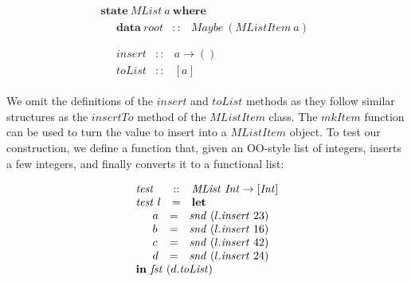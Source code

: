\documentclass[runningheads,a4paper]{llncs}
\begin{document}
\begin{displaymath}
\begin{array}{l}
\mathbf{state}~\mathit{MList}~a~\mathbf{where} \\
\quad \begin{array}{lcl}
\mathbf{data}~\mathit{root}  & :: & \mathit{Maybe}~(\mathit{MListItem}~a)
\end{array}\\\\
\quad \begin{array}{lcl}
\mathit{insert} & :: & a \to () \\
\mathit{toList} & :: & [a]
\end{array}
\end{array}
\end{displaymath}

We omit the definitions of the $\mathit{insert}$ and $\mathit{toList}$ methods as they follow similar structures as the $\mathit{insertTo}$ method of the $\mathit{MListItem}$ class. The $\mathit{mkItem}$ function can be used to turn the value to insert into a $\mathit{MListItem}$ object. To test our construction, we define a function that, given an OO-style list of integers, inserts a few integers, and finally converts it to a functional list:

\begin{displaymath}
\begin{array}{lcl}
\mathit{test} & :: & \mathit{MList}~\mathit{Int} \to [\mathit{Int}]\\
\mathit{test}~l & = & \mathbf{let} \\
\multicolumn{3}{l}{\quad \begin{array}{lcl}
a & = & \mathit{snd}~(l.\mathit{insert}~23)\\
b & = & \mathit{snd}~(l.\mathit{insert}~16)\\
c & = & \mathit{snd}~(l.\mathit{insert}~42)\\
d & = & \mathit{snd}~(l.\mathit{insert}~24)\\
\end{array}}\\
\multicolumn{3}{l}{\mathbf{in}~\mathit{fst}~(d.\mathit{toList})}
\end{array}
\end{displaymath}
\end{document}
